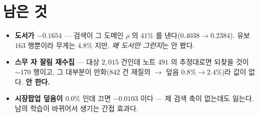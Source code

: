 \documentclass[11pt]{article}
\begin{document}
\section*{남은 것}

\begin{itemize}
\item \textbf{도서가 $-0.1654$} --- 검색이 그 도메인 $\rho$ 의 $41\%$ 를
낸다($0.4038 \to 0.2384$). 유보 $163$ 행뿐이라 무게는 $4.8\%$ 지만,
\emph{왜 도서만 그런지}는 안 봤다.
\item \textbf{스무 자 잘림 재수집} --- 대상 $2{,}015$ 건인데 노트 $491$ 의
추정대로면 되찾을 것이 $\sim\!170$ 행이고, 그 대부분이 만화($842$ 건
재질의 $\to$ 덮음 $0.8\% \to 2.4\%$)라 값이 없다. \textbf{안 한다.}
\item \textbf{시장팝업 덮음이 $0.0\%$} 인데 끄면 $-0.0103$ 이다 --- 제
검색 축이 없는데도 잃는다. 남의 학습이 바뀌어서 생기는 간접 효과다.
\end{itemize}
\end{document}
